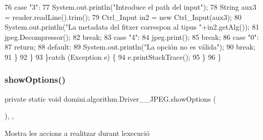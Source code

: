 \begin{DoxyCode}
76                 \textcolor{keywordflow}{case} \textcolor{stringliteral}{"3"}:
77                     System.out.println(\textcolor{stringliteral}{"Introduce el path del input"});
78                     String aux3 = reader.readLine().trim();
79                     Ctrl\_Input in2 = \textcolor{keyword}{new} Ctrl\_Input(aux3);
80                     System.out.println(\textcolor{stringliteral}{"La metadata del fitxer correspon al tipus "}+in2.getAlg());
81                     jpeg.Decompressor();
82                 \textcolor{keywordflow}{break};
83                 \textcolor{keywordflow}{case} \textcolor{stringliteral}{"4"}:
84                     jpeg.print();
85                 \textcolor{keywordflow}{break};
86                 \textcolor{keywordflow}{case} \textcolor{stringliteral}{"0"}:
87                     \textcolor{keywordflow}{return};
88                 \textcolor{keywordflow}{default}:
89                     System.out.println(\textcolor{stringliteral}{"La opción no es válida"});
90                 \textcolor{keywordflow}{break};
91             \}
92         \}
93     \}\textcolor{keywordflow}{catch} (Exception e) \{
94         e.printStackTrace();
95     \}
96     \}
\end{DoxyCode}
\mbox{\label{classdomini_1_1algorithm_1_1Driver____JPEG_a62ce35e061afe893bd03af9bfff41c33}} 
\subsubsection{\texorpdfstring{show\+Options()}{showOptions()}}
{\footnotesize\ttfamily private static void domini.\+algorithm.\+Driver\+\_\+\+\_\+\+J\+P\+E\+G.\+show\+Options (\begin{DoxyParamCaption}{ }\end{DoxyParamCaption})\hspace{0.3cm}{\ttfamily [inline]}, {\ttfamily [static]}, {\ttfamily [private]}}



Mostra les accions a realitzar durant l\textquotesingle{}execució 


